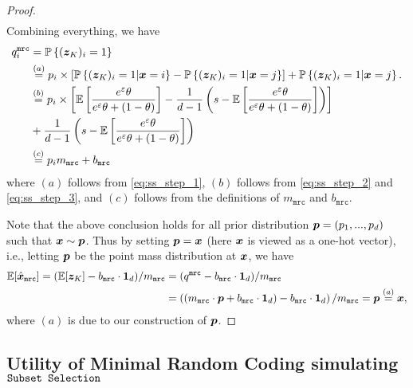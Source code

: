 \begin{proof}
\begin{align}
\end{align}
Combining everything, we have
\begin{align}
    q^{\texttt{mrc}}_i & = \mathbb{P}\left\{({\boldsymbol{z}}_K)_i = 1\right\} \\
    & \stackrel{(a)}{=} p_i \times \left[ \mathbb{P}\left\{ ({\boldsymbol{z}}_K)_i = 1 \middle\vert {\boldsymbol{x}} = i\right\} - \mathbb{P}\left\{ ({\boldsymbol{z}}_K)_i = 1 \middle\vert {\boldsymbol{x}} = j\right\} \right] + \mathbb{P}\left\{ ({\boldsymbol{z}}_K)_i = 1 \middle\vert {\boldsymbol{x}} = j\right\}. \\
    & \stackrel{(b)}{=} p_i \times \left[ \mathbb{E}\left[ \frac{e^\varepsilon \theta}{e^\varepsilon \theta + (1-\theta)} \right] - \frac{1}{d-1}\left( s - \mathbb{E}\left[ \frac{e^\varepsilon \theta}{e^\varepsilon \theta +(1-\theta)}\right] \right) \right] \\
    &  + \frac{1}{d-1}\left( s - \mathbb{E}\left[ \frac{e^\varepsilon \theta}{e^\varepsilon \theta +(1-\theta)}\right] \right) \\
    & \stackrel{(c)}{=} p_i  m_\texttt{mrc} + b_\texttt{mrc}
\end{align}
where $(a)$ follows from \eqref{eq:ss_step_1}, $(b)$ follows from \eqref{eq:ss_step_2} and \eqref{eq:ss_step_3}, and $(c)$ follows from the definitions of $m_\texttt{mrc}$ and $b_\texttt{mrc}$. 

Note that the above conclusion holds for all prior distribution ${\boldsymbol{p}} = (p_1, ..., p_d)$ such that ${\boldsymbol{x}} \sim {\boldsymbol{p}}$. Thus by setting ${\boldsymbol{p}} = {\boldsymbol{x}}$ (here ${\boldsymbol{x}}$ is viewed as a one-hot vector), i.e., letting ${\boldsymbol{p}}$ be the point mass distribution at ${\boldsymbol{x}}$, we have
\begin{align}
    \mathbb{E}[\hat{{\boldsymbol{x}}}_\texttt{mrc}] = (\mathbb{E}[ {\boldsymbol{z}}_K ] - b_\texttt{mrc}\cdot\mathbf{1}_d)/m_\texttt{mrc}
    & = ( q^{\texttt{mrc}} - b_\texttt{mrc}\cdot\mathbf{1}_d)/m_\texttt{mrc} \\
    & = \left(\left( m_\texttt{mrc}\cdot {\boldsymbol{p}} + b_\texttt{mrc}\cdot\mathbf{1}_d\right) -b_\texttt{mrc}\cdot\mathbf{1}_d\right)/m_\texttt{mrc} = {\boldsymbol{p}} \stackrel{(a)}{=} {\boldsymbol{x}},
\end{align}
where $(a)$ is due to our construction of ${\boldsymbol{p}}$.
\end{proof}


 \subsection{Utility of Minimal Random Coding simulating \texorpdfstring{$\texttt{Subset Selection}$}{Subset Selection}}\label{appendix:mrc_ss_ut}
 
